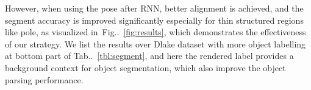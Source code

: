 \documentclass[10pt,twocolumn,letterpaper]{article}
\makeatletter
\newcommand{\figref}[1]{Fig\onedot~\ref{#1}}
\newcommand{\tabref}[1]{Tab\onedot~\ref{#1}}
\DeclareRobustCommand\onedot{\futurelet\@let@token\@onedot}
\def\onedot{\ifx\@let@token.\else.\null\fi\xspace}
\def\ie{\emph{i.e.}}
\makeatother
\begin{document}
However, when using the pose after RNN, better alignment is achieved, and the segment accuracy is improved significantly especially for thin structured regions like pole, as visualized in~\figref{fig:results}, which demonstrates the effectiveness of our strategy. We list the results over Dlake dataset with more object labelling at bottom part of \tabref{tbl:segment}, and here the rendered label provides a background context for object segmentation, which also improve the object parsing performance. 
\end{document}
